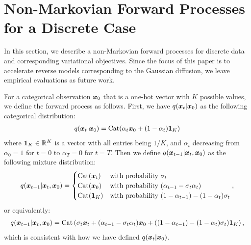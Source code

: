 \newpage
\appendix

\section{Non-Markovian Forward Processes for a Discrete Case}
\label{app:discrete}
In this section, we describe a non-Markovian forward processes for discrete data and corresponding variational objectives. Since the focus of this paper is to accelerate reverse models corresponding to the Gaussian diffusion, we leave empirical evaluations as future work. 

For a categorical observation ${\bm{x}}_0$ that is a one-hot vector with $K$ possible values, we define the forward process as follows. First, we have $q({\bm{x}}_t | {\bm{x}}_0)$ as the following categorical distribution:
\begin{align}
    q({\bm{x}}_t | {\bm{x}}_0) = \mathrm{Cat}(\alpha_t {\bm{x}}_0 + (1 - \alpha_t) {\bm{1}}_K)
\end{align}
where ${\bm{1}}_K \in \mathbb{R}^{K}$ is a vector with all entries being $1/K$, and $\alpha_t$ decreasing from $\alpha_0 = 1$ for $t = 0$ to $\alpha_T = 0$ for $t = T$.
Then we define $q({\bm{x}}_{t-1} | {\bm{x}}_t, {\bm{x}}_0)$ as the following mixture distribution:
\begin{align}
    q({\bm{x}}_{t-1} | {\bm{x}}_t, {\bm{x}}_0) = \begin{cases}
    \mathrm{Cat}({\bm{x}}_t) & \text{with probability } \sigma_t \\
    \mathrm{Cat}({\bm{x}}_0) & \text{with probability } (\alpha_{t-1} - \sigma_t \alpha_t) \\
    \mathrm{Cat}({\bm{1}}_K) & \text{with probability } (1 - \alpha_{t-1}) - (1 - \alpha_t) \sigma_t
    \end{cases},
\end{align}
or equivalently:
\begin{align}
    q({\bm{x}}_{t-1} | {\bm{x}}_t, {\bm{x}}_0) = \mathrm{Cat}\left(\sigma_t {\bm{x}}_t + (\alpha_{t-1} - \sigma_t \alpha_t) {\bm{x}}_0 + ((1 - \alpha_{t-1}) - (1 - \alpha_t) \sigma_t) {\bm{1}}_K\right),
\end{align}
which is consistent with how we have defined $q({\bm{x}}_t | {\bm{x}}_0)$. 


